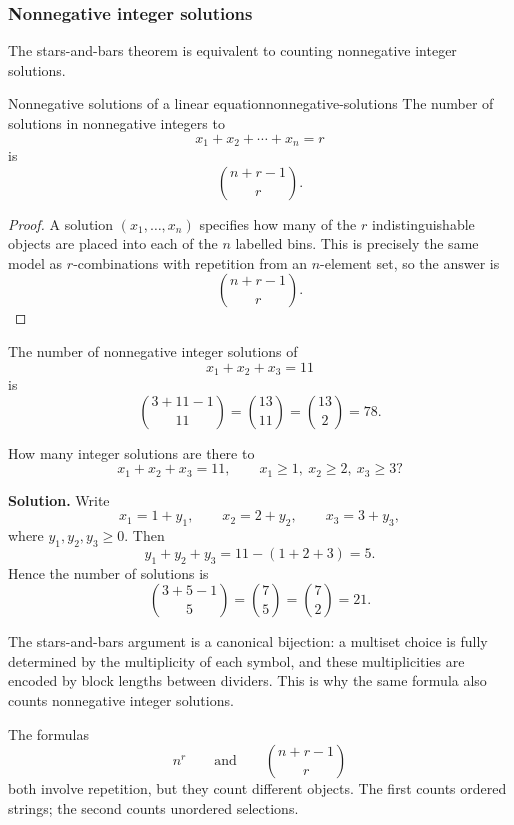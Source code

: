 \subsubsection{Nonnegative integer solutions}

The stars-and-bars theorem is equivalent to counting nonnegative integer solutions.

\begin{theorem}{Nonnegative solutions of a linear equation}{nonnegative-solutions}
The number of solutions in nonnegative integers to
\[
x_1+x_2+\cdots+x_n=r
\]
is
\[
\binom{n+r-1}{r}.
\]
\end{theorem}

\begin{proof}
A solution $(x_1,\dots,x_n)$ specifies how many of the $r$ indistinguishable objects are placed into each of the $n$ labelled bins. This is precisely the same model as $r$-combinations with repetition from an $n$-element set, so the answer is
\[
\binom{n+r-1}{r}.
\]
\end{proof}

\begin{examplebox}[title={Equation $x_1+x_2+x_3=11$}]
The number of nonnegative integer solutions of
\[
x_1+x_2+x_3=11
\]
is
\[
\binom{3+11-1}{11}=\binom{13}{11}=\binom{13}{2}=78.
\]
\end{examplebox}

\begin{examplebox}[title={Lower bounds by shifting variables}]
How many integer solutions are there to
\[
x_1+x_2+x_3=11,
\qquad
x_1\ge 1,\ x_2\ge 2,\ x_3\ge 3?
\]

\textbf{Solution.}
Write
\[
x_1=1+y_1,\qquad x_2=2+y_2,\qquad x_3=3+y_3,
\]
where $y_1,y_2,y_3\ge 0$. Then
\[
y_1+y_2+y_3=11-(1+2+3)=5.
\]
Hence the number of solutions is
\[
\binom{3+5-1}{5}=\binom{7}{5}=\binom{7}{2}=21.
\]
\end{examplebox}

\begin{extension}[title={Canonical stars-and-bars encoding}]
The stars-and-bars argument is a canonical bijection: a multiset choice is fully determined by the multiplicity of each symbol, and these multiplicities are encoded by block lengths between dividers. This is why the same formula also counts nonnegative integer solutions.
\end{extension}

\begin{commonmistake}[title={Repetition allowed does not mean order matters}]
The formulas
\[
n^r
\qquad\text{and}\qquad
\binom{n+r-1}{r}
\]
both involve repetition, but they count different objects. The first counts ordered strings; the second counts unordered selections.
\end{commonmistake}

